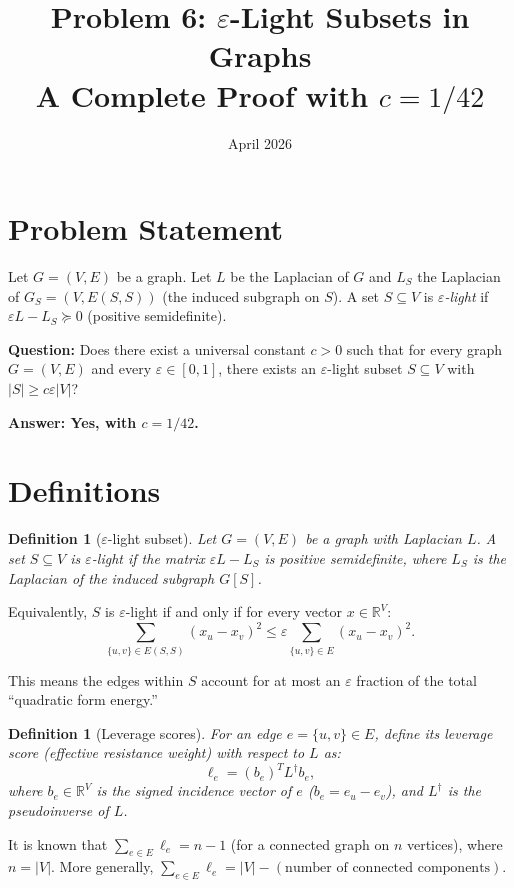 \documentclass[12pt]{article}
\title{Problem 6: $\varepsilon$-Light Subsets in Graphs\\
\large A Complete Proof with $c = 1/42$}
\author{}
\date{April 2026}
\newtheorem{definition}[theorem]{Definition}
\begin{document}
\maketitle

\section{Problem Statement}

Let $G = (V, E)$ be a graph. Let $L$ be the Laplacian of $G$ and $L_S$ the Laplacian of $G_S = (V, E(S,S))$ (the induced subgraph on $S$). A set $S \subseteq V$ is \emph{$\varepsilon$-light} if $\varepsilon L - L_S \succeq 0$ (positive semidefinite).

\textbf{Question:} Does there exist a universal constant $c > 0$ such that for every graph $G = (V,E)$ and every $\varepsilon \in [0,1]$, there exists an $\varepsilon$-light subset $S \subseteq V$ with $|S| \geq c\varepsilon|V|$?

\textbf{Answer: Yes, with $c = 1/42$.}

\section{Definitions}

\begin{definition}[$\varepsilon$-light subset]
Let $G = (V,E)$ be a graph with Laplacian $L$. A set $S \subseteq V$ is \emph{$\varepsilon$-light} if the matrix $\varepsilon L - L_S$ is positive semidefinite, where $L_S$ is the Laplacian of the induced subgraph $G[S]$.
\end{definition}

Equivalently, $S$ is $\varepsilon$-light if and only if for every vector $x \in \mathbb{R}^V$:
\[
\sum_{\{u,v\} \in E(S,S)} (x_u - x_v)^2 \leq \varepsilon \sum_{\{u,v\} \in E} (x_u - x_v)^2.
\]

This means the edges within $S$ account for at most an $\varepsilon$ fraction of the total ``quadratic form energy.''

\begin{definition}[Leverage scores]
For an edge $e = \{u,v\} \in E$, define its \emph{leverage score} (effective resistance weight) with respect to $L$ as:
\[
\ell_e = (b_e)^T L^\dagger b_e,
\]
where $b_e \in \mathbb{R}^V$ is the signed incidence vector of $e$ ($b_e = e_u - e_v$), and $L^\dagger$ is the pseudoinverse of $L$.
\end{definition}

It is known that $\sum_{e \in E} \ell_e = n - 1$ (for a connected graph on $n$ vertices), where $n = |V|$. More generally, $\sum_{e \in E} \ell_e = |V| - (\text{number of connected components})$.
\end{document}
